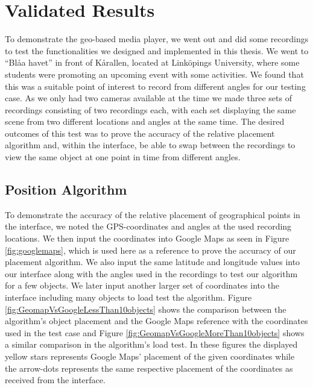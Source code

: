 \chapter{Validated Results}
\label{cha:results}

To demonstrate the geo-based media player, we went out and did some recordings to test the functionalities we designed and implemented in this thesis. We went to “Blåa havet” in front of Kårallen, located at Linköpings University, where some students were promoting an upcoming event with some activities. We found that this was a suitable point of interest to record from different angles for our testing case. As we only had two cameras available at the time we made three sets of recordings consisting of two recordings each, with each set displaying the same scene from two different locations and angles at the same time. The desired outcomes of this test was to prove the accuracy of the relative placement algorithm and, within the interface, be able to swap between the recordings to view the same object at one point in time from different angles.

\section{Position Algorithm}
\label{sec:positionalgorithm}

To demonstrate the accuracy of the relative placement of geographical points in the interface, we noted the GPS-coordinates and angles at the used recording locations. We then input the coordinates into Google Maps as seen in Figure \ref{fig:googlemaps}, which is used here as a reference to prove the accuracy of our placement algorithm. We also input the same latitude and longitude values into our interface along with the angles used in the recordings to test our algorithm for a few objects. We later input another larger set of coordinates into the interface including many objects to load test the algorithm. Figure \ref{fig:GeomapVsGoogleLessThan10objects} shows the comparison between the algorithm's object placement and the Google Maps reference with the coordinates used in the test case and Figure \ref{fig:GeomapVsGoogleMoreThan10objects} shows a similar comparison in the algorithm's load test. In these figures the displayed yellow stars represents Google Maps' placement of the given coordinates while the arrow-dots represents the same respective placement of the coordinates as received from the interface.


